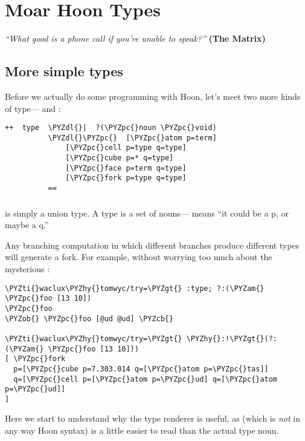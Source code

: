 \chapter{Moar Hoon Types}

\emph{``What good is a phone call if you're unable to speak?''}
\textbf{(The Matrix)}

\section{More simple types}

Before we actually do some programming with Hoon, let's meet two 
more kinds of type--- and :

\begin{framed_shaded}
\begin{Verbatim}[fontsize=\relsize{-2.5},fontseries=b,commandchars=\\\{\}]
++  type  \PYZdl{}|  ?(\PYZpc{}noun \PYZpc{}void)
          \PYZdl{}\PYZpc{}  [\PYZpc{}atom p=term]
              [\PYZpc{}cell p=type q=type]
              [\PYZpc{}cube p=* q=type]  
              [\PYZpc{}face p=term q=type]
              [\PYZpc{}fork p=type q=type]
          ==
\end{Verbatim}
\end{framed_shaded}

\subsection{}

 is simply a union type.  A type is a set of nouns---\kode{[\%fork p q]} means ``it could be a p, or maybe a q.''

Any branching computation in which different branches produce
different types will generate a fork.  For example, without
worrying too much about the mysterious :

\begin{framed_shaded}
\begin{Verbatim}[fontsize=\relsize{-2.5},fontseries=b,commandchars=\\\{\}]
\PYZti{}waclux\PYZhy{}tomwyc/try=\PYZgt{} :type; ?:(\PYZam{} \PYZpc{}foo [13 10])
\PYZpc{}foo
\PYZob{} \PYZpc{}foo [@ud @ud] \PYZcb{}

\PYZti{}waclux\PYZhy{}tomwyc/try=\PYZgt{} \PYZhy{}:!\PYZgt{}(?:(\PYZam{} \PYZpc{}foo [13 10]))
[ \PYZpc{}fork
  p=[\PYZpc{}cube p=7.303.014 q=[\PYZpc{}atom p=\PYZpc{}tas]]
  q=[\PYZpc{}cell p=[\PYZpc{}atom p=\PYZpc{}ud] q=[\PYZpc{}atom p=\PYZpc{}ud]]
]
\end{Verbatim}
\end{framed_shaded}
Here we start to understand why the type renderer is useful, as
 (which is \emph{not} in any way Hoon syntax) is a
little easier to read than the actual type noun.


